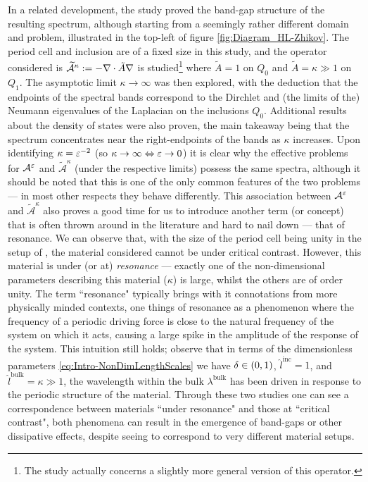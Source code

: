 In a related development, the study \cite{hempel2000spectral} proved the band-gap structure of the resulting spectrum, although starting from a seemingly rather different domain and problem, illustrated in the top-left of figure \ref{fig:Diagram_HL-Zhikov}.
The period cell and inclusion are of a fixed size in this study, and the operator considered is $\widetilde{\mathcal{A}}^\kappa:=-\nabla\cdot\tilde{A}\nabla$ is studied\footnote{The study \cite{hempel2000spectral} actually concerns a slightly more general version of this operator.} where $\widetilde{A}=1$ on $Q_0$ and $\widetilde{A}=\kappa\gg 1$ on $Q_1$.
The asymptotic limit $\kappa\rightarrow\infty$ was then explored, with the deduction that the endpoints of the spectral bands correspond to the Dirchlet and (the limits of the) Neumann eigenvalues of the Laplacian on the inclusions $Q_0$.
Additional results about the density of states were also proven, the main takeaway being that the spectrum concentrates near the right-endpoints of the bands as $\kappa$ increases. 
Upon identifying $\kappa=\varepsilon^{-2}$ (so $\kappa\rightarrow\infty \Leftrightarrow \varepsilon\rightarrow0$) it is clear why the effective problems for $\mathcal{A}^{\varepsilon}$ and $\widetilde{\mathcal{A}}^{\kappa}$ (under the respective limits) possess the same spectra, although it should be noted that this is one of the only common features of the two problems --- in most other respects they behave differently.
This association between $\mathcal{A}^{\varepsilon}$ and $\widetilde{\mathcal{A}}^{\kappa}$ also proves a good time for us to introduce another term (or concept) that is often thrown around in the literature and hard to nail down --- that of resonance.
We can observe that, with the size of the period cell being unity in the setup of \cite{hempel2000spectral}, the material considered cannot be under critical contrast.
However, this material is under (or at) \emph{resonance} --- exactly one of the non-dimensional parameters describing this material ($\kappa$) is large, whilst the others are of order unity.
The term ``resonance" typically brings with it connotations from more physically minded contexts, one things of resonance as a phenomenon where the frequency of a periodic driving force is close to the natural frequency of the system on which it acts, causing a large spike in the amplitude of the response of the system.
This intuition still holds; observe that in terms of the dimensionless parameters \eqref{eq:Intro-NonDimLengthScales} we have $\delta\in\left( 0,1 \right)$, $\hat{l}^{\mathrm{inc}}=1$, and $\hat{l}^{\mathrm{bulk}}=\kappa\gg 1$, the wavelength within the bulk $\lambda^{\mathrm{bulk}}$ has been driven in response to the periodic structure of the material.
Through these two studies one can see a correspondence between materials ``under resonance" and those at ``critical contrast", both phenomena can result in the emergence of band-gaps or other dissipative effects, despite seeing to correspond to very different material setups.

